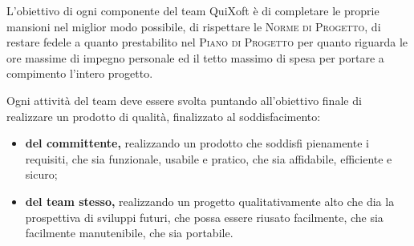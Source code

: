 \documentclass[11pt,a4paper]{article}
\begin{document}
L'obiettivo di ogni componente del team QuiXoft è di completare le proprie mansioni nel miglior modo possibile, di rispettare le \textsc{Norme di Progetto}, di restare fedele a quanto prestabilito nel \textsc{Piano di Progetto} per quanto riguarda le ore massime di impegno personale ed il tetto massimo di spesa per portare a compimento l'intero progetto.

Ogni attività del team deve essere svolta puntando all'obiettivo finale di realizzare un prodotto di qualità, finalizzato al soddisfacimento:
\begin{itemize}
	\item \textbf{del committente,} realizzando un prodotto che soddisfi pienamente i requisiti, che sia funzionale, usabile e pratico, che sia affidabile, efficiente e sicuro;
	\item \textbf{del team stesso,} realizzando un progetto qualitativamente alto che dia la prospettiva di sviluppi futuri, che possa essere riusato facilmente, che sia facilmente manutenibile, che sia portabile.
\end{itemize}
\end{document}
